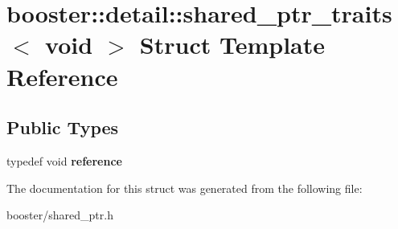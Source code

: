 \section{booster\-:\-:detail\-:\-:shared\-\_\-ptr\-\_\-traits$<$ void $>$ Struct Template Reference}
\label{structbooster_1_1detail_1_1shared__ptr__traits_3_01void_01_4}
\subsection*{Public Types}
\begin{DoxyCompactItemize}
\item 
typedef void {\bfseries reference}\label{structbooster_1_1detail_1_1shared__ptr__traits_3_01void_01_4_a963de5367a05086b331662727a190fd1}

\end{DoxyCompactItemize}


The documentation for this struct was generated from the following file\-:\begin{DoxyCompactItemize}
\item 
booster/shared\-\_\-ptr.\-h\end{DoxyCompactItemize}
